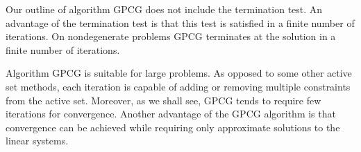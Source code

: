 Our outline of algorithm GPCG does not include the termination test.
An advantage of the termination test  is 
that this test is satisfied \cite{JVB92}
in a finite number of iterations.
On nondegenerate problems GPCG terminates \cite{more-toraldo}
at the solution in a finite number of iterations.

Algorithm GPCG is suitable for large problems.
As opposed to some other active set methods,
each iteration is capable of
adding or removing multiple constraints from the active set.
Moreover, as we shall see, GPCG tends to require few iterations
for convergence.
Another advantage of the GPCG algorithm is that convergence
can be achieved while requiring only approximate solutions
to the linear systems.




